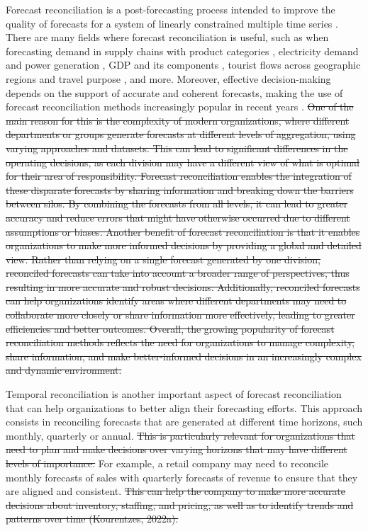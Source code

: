 \documentclass[review, 11pt]{elsarticle}
\theoremstyle{definition}
\begin{document}
Forecast reconciliation is a post-forecasting process intended to improve the quality of forecasts for a system of linearly constrained multiple time series \citep{hyndman2011, panagiotelis2021}. There are many fields where forecast reconciliation is useful, such as when forecasting demand in supply chains with product categories \citep{punia2020, kourentzes2021}, electricity demand and power generation \citep{spiliotis2020, bentaieb2021}, GDP and its components \citep{athanasopoulos2020}, tourist flows across geographic regions and travel purpose \citep{kourentzes2019}, and more. Moreover, effective decision-making depends on the support of accurate and coherent forecasts, making the use of forecast reconciliation methods increasingly popular in recent years {\color{blue}\citep{athanasopoulos2023}}. {\color{red}\sout{One of the main reason for this is the complexity of modern organizations, where different departments or groups generate forecasts at different levels of aggregation, using varying approaches and datasets. This can lead to significant differences in the operating decisions, as each division may have a different view of what is optimal for their area of responsibility. Forecast reconciliation enables the integration of these disparate forecasts by sharing information and breaking down the barriers between silos. By combining the forecasts from all levels, it can lead to greater accuracy and reduce errors that might have otherwise occurred due to different assumptions or biases. Another benefit of forecast reconciliation is that it enables organizations to make more informed decisions by providing a global and detailed view. Rather than relying on a single forecast generated by one division, reconciled forecasts can take into account a broader range of perspectives, thus resulting in more accurate and robust decisions. Additionally, reconciled forecasts can help organizations identify areas where different departments may need to collaborate more closely or share information more effectively, leading to greater efficiencies and better outcomes. Overall, the growing popularity of forecast reconciliation methods reflects the need for organizations to manage complexity, share information, and make better-informed decisions in an increasingly complex and dynamic environment.}}

Temporal reconciliation is another important aspect of forecast reconciliation that can help organizations to better align their forecasting efforts. This approach consists in reconciling forecasts that are generated at different time horizons, such monthly, quarterly or annual. {\color{red}\sout{This is particularly relevant for organizations that need to plan and make decisions over varying horizons that may have different levels of importance.}} For example, a retail company may need to reconcile monthly forecasts of sales with quarterly forecasts of revenue to ensure that they are aligned and consistent. {\color{red}\sout{This can help the company to make more accurate decisions about inventory, staffing, and pricing, as well as to identify trends and patterns over time (Kourentzes, 2022a).}} %
\end{document}
